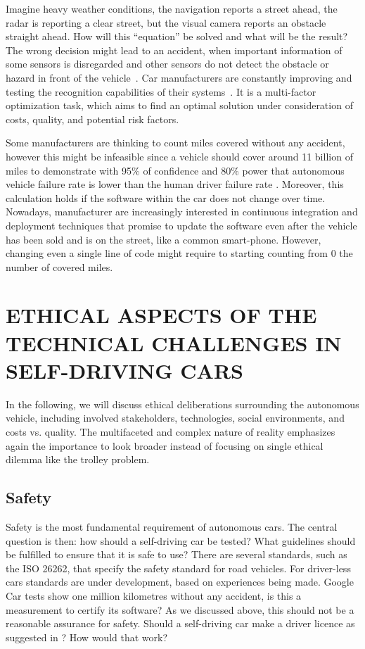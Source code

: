 Imagine heavy weather conditions, the navigation reports a street ahead, the radar is reporting a clear street, but the visual camera reports an obstacle straight ahead. How will this \enquote{equation} be solved and what will be the result? The wrong decision might lead to an accident, when important information of some sensors is disregarded and other sensors do not detect the obstacle or hazard in front of the vehicle~\cite{Tesla2016_tragicloss}. Car manufacturers are constantly improving and testing the recognition capabilities of their systems~\cite{Tesla2016_upgrade}. It is a multi-factor optimization task, which aims to find an optimal solution under consideration of costs, quality, and potential risk factors.

Some manufacturers are thinking to count miles covered without any accident, however this might be infeasible since a vehicle should cover around 11 billion of miles to demonstrate with 95\% of confidence and 80\% power that autonomous vehicle failure rate is lower than the human driver failure rate \cite{KALRA2016182}. Moreover, this calculation holds if the software within the car does not change over time. Nowadays, manufacturer are increasingly interested in continuous integration and deployment techniques that promise to update the software even after the vehicle has been sold and is on the street, like a common smart-phone. However, changing even a single line of code might require to starting counting from 0 the number of covered miles.


\section{ETHICAL ASPECTS OF THE TECHNICAL CHALLENGES IN SELF-DRIVING CARS}
\label{sec:EAofTC}

In the following, we will discuss ethical deliberations surrounding the autonomous vehicle, including involved stakeholders, technologies, social environments, and costs vs. quality. The multifaceted and complex nature of reality emphasizes again the importance to look broader instead of focusing on single ethical dilemma like the trolley problem.

\subsection{Safety}
\label{sec:EAofTC:Safety}

Safety is the most fundamental requirement of autonomous cars. The central question is then: how should a self-driving car be tested? What guidelines should be fulfilled to ensure that it is safe to use? There are several standards, such as the ISO 26262, that specify the safety standard for road vehicles. For driver-less cars standards are under development, based on experiences being made. 
Google Car tests show one million kilometres without any accident, is this a measurement to certify its software? As we discussed above, this should not be a reasonable assurance for safety. Should a self-driving car make a driver licence as suggested in \cite{McBride:2016:EDC:2874239.2874265}? How would that work? 


